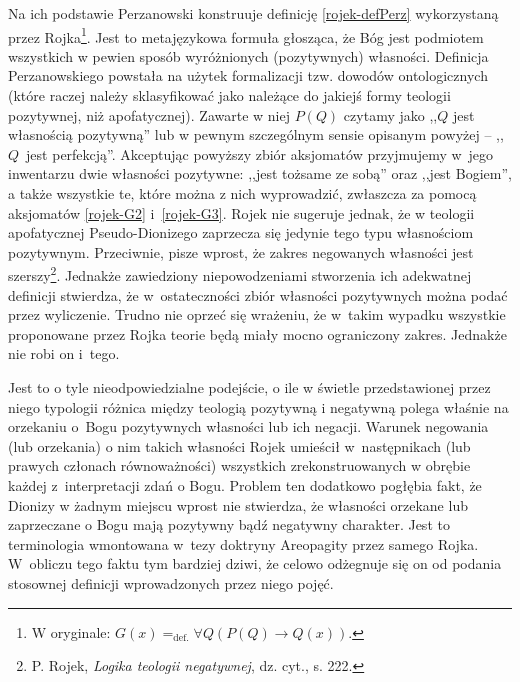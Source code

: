 Na ich podstawie Perzanowski konstruuje definicję \eqref{rojek-defPerz} wykorzystaną przez Rojka\footnote{W oryginale:
$G(x) =_{\text{def.}} \forall Q (P(Q) \to Q(x))$.
}. Jest to metajęzykowa formuła głosząca, że Bóg jest podmiotem
wszystkich w pewien sposób wyróżnionych (pozytywnych) własności. Definicja Perzanowskiego powstała na użytek
formalizacji tzw. dowodów ontologicznych (które raczej należy sklasyfikować jako należące do jakiejś
formy teologii pozytywnej, niż apofatycznej). Zawarte w niej $P(Q)$ czytamy jako ,,$Q$ jest
własnością pozytywną'' lub w pewnym szczególnym sensie opisanym powyżej -- ,,$Q$~jest perfekcją''. Akceptując powyższy zbiór aksjomatów przyjmujemy w~jego inwentarzu dwie własności pozytywne:
,,jest tożsame ze sobą'' oraz ,,jest Bogiem'', a także wszystkie te, które można z nich 
wyprowadzić, zwłaszcza za pomocą aksjomatów \eqref{rojek-G2} i~\eqref{rojek-G3}.
Rojek nie sugeruje jednak, że w teologii apofatycznej
Pseudo-Dionizego zaprzecza się jedynie tego typu własnościom
pozytywnym. Przeciwnie, pisze wprost, że zakres negowanych własności
jest szerszy\footnote{P. Rojek, \textit{Logika teologii negatywnej}, dz. cyt., s. 222. }. 
Jednakże zawiedziony niepowodzeniami
stworzenia ich adekwatnej definicji stwierdza, że
w~ostateczności zbiór własności
pozytywnych można podać przez wyliczenie. Trudno nie oprzeć się wrażeniu, że w~takim wypadku
wszystkie proponowane przez Rojka teorie będą miały mocno ograniczony
zakres. Jednakże nie robi on i~tego.










Jest
to o tyle  nieodpowiedzialne podejście, o ile w świetle przedstawionej przez niego typologii
różnica między teologią pozytywną i negatywną polega właśnie na orzekaniu o~Bogu pozytywnych własności lub ich negacji. Warunek negowania (lub orzekania) o nim takich własności Rojek umieścił w~następnikach (lub prawych członach równoważności) wszystkich zrekonstruowanych w obrębie każdej z~interpretacji zdań o Bogu.
Problem ten dodatkowo pogłębia fakt, że Dionizy w żadnym miejscu wprost
nie stwierdza, że własności orzekane lub zaprzeczane o Bogu mają
pozytywny bądź negatywny charakter. Jest to terminologia wmontowana w~tezy doktryny Areopagity przez samego Rojka.
W~obliczu tego faktu tym
bardziej dziwi, że celowo odżegnuje się on od podania stosownej
definicji wprowadzonych przez niego pojęć.


